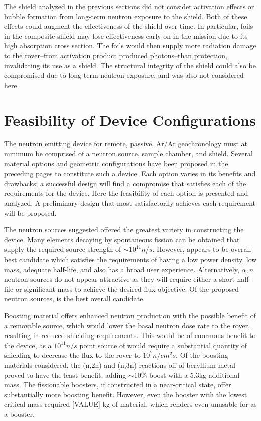 \documentclass{mc2015}
\begin{document}
The shield analyzed in the previous sections did not consider activation effects or bubble formation from long-term neutron exposure to the shield. Both of these effects could augment the effectiveness of the shield over time. In particular, foils in the composite shield may lose effectiveness early on in the mission due to its high absorption cross section. The foils would then supply more radiation damage to the rover--from activation product produced photons--than protection, invalidating its use as a shield. The structural integrity of the shield could also be compromised due to long-term neutron exposure, and was also not considered here.  


\section{Feasibility of Device Configurations}
\label{sec:feasibility}

The neutron emitting device for remote, passive, Ar/Ar geochronology must at minimum be comprised of a neutron source, sample chamber, and shield. Several material options and geometric configurations have been proposed in the preceding pages to constitute such a device. Each option varies in its benefits and drawbacks; a successful design will find a compromise that satisfies each of the requirements for the device. Here the feasibility of each option is presented and analyzed. A preliminary design that most satisfactorily achieves each requirement will be proposed. 

The neutron sources suggested offered the greatest variety in constructing the device. Many elements decaying by spontaneous fission can be obtained that supply the required source strength of $\sim10^{11} n/s$. However,  appears to be overall best candidate which satisfies the requirements of having a low power density, low mass, adequate half-life, and also has a broad user experience. Alternatively, $\alpha,n$ neutron sources do not appear attractive as they will require either a short half-life or significant mass to achieve the desired flux objective. Of the proposed neutron sources,  is the best overall candidate. 

Boosting material offers enhanced neutron production with the possible benefit of a removable source, which would lower the basal neutron dose rate to the rover, resulting in reduced shielding requirements. This would be of enormous benefit to the device, as a $10^{11} n/s$ point source of  would require a substantial quantity of shielding to decrease the flux to the rover to $10^{7} n/{{cm^2}s}$. Of the boosting materials considered, the (n,2n) and (n,3n) reactions off of beryllium metal proved to have the least benefit, adding $\sim$10\% boost with a 5.3kg additional mass. The fissionable boosters, if constructed in a near-critical state, offer substantially more boosting benefit. However, even the booster with the lowest critical mass required [VALUE] kg of material, which renders even  unusable for as a booster. 
\end{document}

